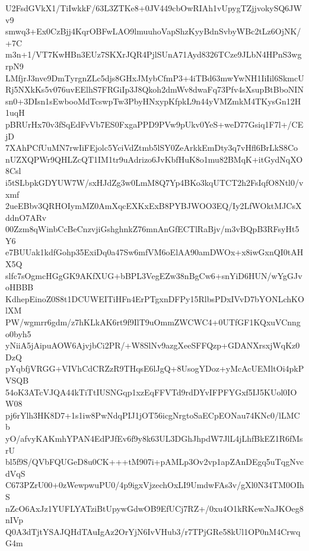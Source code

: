 U2FsdGVkX1/TiIwkkF/63L3ZTKe8+0JV449cbOwRIAh1vUpygTZjjvokySQ6JWv9
smwq3+Ex0CzBjj4KqrOBFwLAO9lmuuhoVapShzKyyBdnSvbyWBc2tLz6OjNK/+7C
m3n+1/VT7KwHBn3EUz7SKXrJQR4PjlSUnA71Ayd8326TCze9JLbN4HPnS3wgrpN9
LMfjrJ3nve9DmTyrgnZLc5djs8GHxJMybCfmP3+4iTBd63mwYwNH1IiIil6SkmcU
Rj5NXkKs5v076uvEElhS7FRGiIp3J8Qkoh2dmWv8dwaFq73Pfv4sXsupBtBboNIN
sn0+3DIsn1sEwbooMdTcswpTw3PbyHNxypKfpkL9n44yVMZmkM4TKysGn12H1uqH
pBRUrHx70v3fSqEdFvVb7ES0FxgaPPD9PVw9pUkv0YeS+weD77Gsiq1F7l+/CEjD
7XAhPCfUuMN7rwIiFEjolc5YciVdZtmb5lSY0ZeArkkEmDty3q7vHfl6BrLkS8Co
nUZXQPWr9QHLZcQT1IM1tr9uAdrizo6JvKbfHuK8o1mu82BMqK+itGydNqXO8Csl
i5tSLbpkGDYUW7W/sxHJdZg3w0LmM8Q7Yp4BKo3kqUTCT2h2FsIqfO8Ntl0/vxmf
2ueEBbv3QRHOIymMZ0AmXqcEXKxExB8PYBJWOO3EQ/Iy2LfWOktMJCsXddnO7ARv
00Zzm8qWinbCcBeCnzvjiGshghnkZ76mnAnGfECTlRaBjv/m3vBQpB3RFsyHt5Y6
e7BUUak1kdfGohp35ExiDq0a47Sw6mfVM6oElAA90amDWOx+x8iwGxnQI0tAHX5Q
slfc7sOgmcHGgGK9AKfXUG+bBPL3VegEZw38nBgCw6+snYiD6HUN/wYgGJvoHBBB
KdhepEinoZ0S8t1DCUWEITiHFn4ErPTgxnDFPy15RlbsPDxIVvD7bYONLchKOlXM
PW/wgmrr6gdm/z7hKLkAK6rt9f9IlT9uOmmZWCWC4+0UTfGF1KQxuVCnngo0byh5
yNiiA5jAipuAOW6AjvjbCi2PR/+W8SlNv9azgXeeSFFQzp+GDANXrsxjWqKz0DzQ
pYqbfjVRGG+VIVhCdCRZzR9THqsE6lJgQ+8UsogYDoz+yMcAcUEMltOi4pkPVSQB
54oK3ATcVJQA44kTiTtIUSNGqp1xzEqFFVTd9rdDYvIFPFYGxf5IJ5KUol0IOW08
pj6rYlh3HK8D7+1s1iw8PwNdqPIJ1jOT56icgNrgtoSaECpEONau74KNc0/lLMCb
yO/afvyKAKmhYPAN4EdPJfEv6f9y8k63UL3DGhJhpdW7JlL4jLhfBkEZ1R6fMsrU
bl5f9S/QVbFQUGeD8u0CK+++tM907i+pAMLp3Ov2vp1apZAnDEgq5uTqgNvcdVqS
C673PZrU00+0zWewpwuPU0/4p9igxVjzechOxLI9UmdwFAs3v/gXl0N34TM0OIhS
nZcO6AxJz1YUFLYATziBtUpywGdwOB9EfUCj7RZ+/0xu4O1kRKewNaJKOeg8nIVp
Q0A3dTjtYSAJQHdTAuIgAz2OrYjN6IvVHub3/r7TPjGRe58kUl1OP0nM4CrwqG4m
